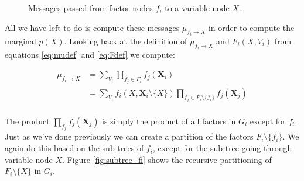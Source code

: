 \begin{figure}[h!]
\centering
{}
\caption{Messages passed from factor nodes $f_i$ to
a variable node $X$.}
\label{fig:messages_to_variable}
\end{figure}

\noindent
All we have left to do is compute these messages 
$\mu_{f_i \rightarrow X}$ in order to compute the marginal $p(X)$.
Looking back at the definition of $\mu_{f_i \rightarrow X}$ and 
$F_i(X, V_i)$ from equations \ref{eq:mudef} and \ref{eq:Fdef}
we compute:

\begin{equation}\label{eq:message_decomp}\begin{split}
\mu_{f_i \rightarrow X} 
	&= \sum_{V_i}\prod_{f_j \in F_i} f_j(\textbf{X}_i) \\
	&= \sum_{V_i}f_i(X, \textbf{X}_i \setminus \{X\}) 
		\prod_{f_j \in F_i \setminus \{f_i\}} f_j(\textbf{X}_j)\\
\end{split}\end{equation}

\noindent
The product $\prod_{f_j} f_j(\textbf{X}_j)$ is simply the product
of all factors in $G_i$ except for $f_i$. Just as we've done previously
we can create a partition of the factors $F_i \setminus \{f_i\}$.
We again do this based on the sub-trees of $f_i$, except for the 
sub-tree going through variable node $X$. Figure \ref{fig:subtree_fi}
shows the recursive partitioning of $F_i\setminus \{X\}$ in $G_i$.

